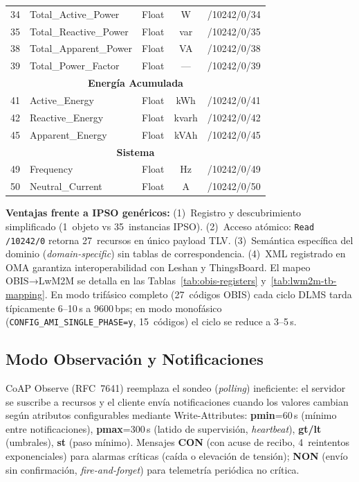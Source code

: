 \begin{table}[H]
{\begin{tabular}{|c|l|c|c|l|}
\hline
34 & Total\_Active\_Power    & Float & W    & /10242/0/34 \\
35 & Total\_Reactive\_Power   & Float & var  & /10242/0/35 \\
38 & Total\_Apparent\_Power   & Float & VA   & /10242/0/38 \\
39 & Total\_Power\_Factor     & Float & ---  & /10242/0/39 \\
\hline
\multicolumn{5}{|c|}{\cellcolor{gray!10}\textbf{Energía Acumulada}} \\
\hline
41 & Active\_Energy   & Float & kWh  & /10242/0/41 \\
42 & Reactive\_Energy & Float & kvarh& /10242/0/42 \\
45 & Apparent\_Energy & Float & kVAh & /10242/0/45 \\
\hline
\multicolumn{5}{|c|}{\cellcolor{gray!10}\textbf{Sistema}} \\
\hline
49 & Frequency        & Float & Hz   & /10242/0/49 \\
50 & Neutral\_Current  & Float & A    & /10242/0/50 \\
\hline
\end{tabular}}%
\end{table}

\textbf{Ventajas frente a IPSO genéricos:} (1)~Registro y descubrimiento simplificado (1~objeto vs 35~instancias IPSO). (2)~Acceso atómico: \texttt{Read /10242/0} retorna 27~recursos en único payload TLV. (3)~Semántica específica del dominio (\emph{domain-specific}) sin tablas de correspondencia. (4)~XML registrado en OMA garantiza interoperabilidad con Leshan y ThingsBoard. El mapeo OBIS→LwM2M se detalla en las Tablas~\ref{tab:obis-registers} y~\ref{tab:lwm2m-tb-mapping}. En modo trifásico completo (27~códigos OBIS) cada ciclo DLMS tarda típicamente 6--10\,s a 9600\,bps; en modo monofásico (\texttt{CONFIG\_AMI\_SINGLE\_PHASE=y}, 15~códigos) el ciclo se reduce a 3--5\,s.

\subsection{Modo Observación y Notificaciones}
\label{sec:nodo-lwm2m-observacion}

CoAP Observe (RFC~7641) reemplaza el sondeo (\emph{polling}) ineficiente: el servidor se suscribe a recursos y el cliente envía notificaciones cuando los valores cambian según atributos configurables mediante Write-Attributes: \textbf{pmin}=60\,s (mínimo entre notificaciones), \textbf{pmax}=300\,s (latido de supervisión, \emph{heartbeat}), \textbf{gt/lt} (umbrales), \textbf{st} (paso mínimo). Mensajes \textbf{CON} (con acuse de recibo, 4~reintentos exponenciales) para alarmas críticas (caída o elevación de tensión); \textbf{NON} (envío sin confirmación, \emph{fire-and-forget}) para telemetría periódica no crítica.

